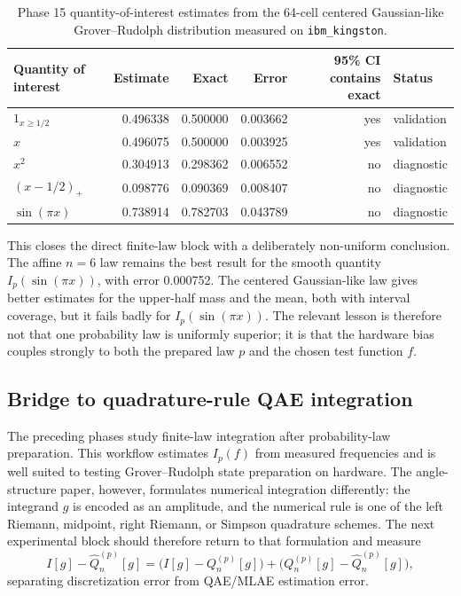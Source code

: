 \begin{table}[h]
\centering
\small
\begin{tabular}{lrrrrl}
\toprule
Quantity of interest & Estimate & Exact & Error & 95\% CI contains exact & Status \\
\midrule
\(1_{x\ge 1/2}\) & 0.496338 & 0.500000 & 0.003662 & yes & validation \\
\(x\) & 0.496075 & 0.500000 & 0.003925 & yes & validation \\
\(x^2\) & 0.304913 & 0.298362 & 0.006552 & no & diagnostic \\
\((x-1/2)_+\) & 0.098776 & 0.090369 & 0.008407 & no & diagnostic \\
\(\sin(\pi x)\) & 0.738914 & 0.782703 & 0.043789 & no & diagnostic \\
\bottomrule
\end{tabular}
\caption{Phase 15 quantity-of-interest estimates from the 64-cell centered
Gaussian-like Grover--Rudolph distribution measured on \texttt{ibm\_kingston}.}
\label{tab:phase15-gaussian-qoi}
\end{table}

This closes the direct finite-law block with a deliberately non-uniform
conclusion. The affine \(n=6\) law remains the best result for the smooth
quantity \(I_p(\sin(\pi x))\), with error 0.000752. The centered Gaussian-like
law gives better estimates for the upper-half mass and the mean, both with
interval coverage, but it fails badly for \(I_p(\sin(\pi x))\). The relevant
lesson is therefore not that one probability law is uniformly superior; it is
that the hardware bias couples strongly to both the prepared law \(p\) and the
chosen test function \(f\).

\subsection{Bridge to quadrature-rule QAE integration}

The preceding phases study finite-law integration after probability-law
preparation. This workflow estimates \(I_p(f)\) from measured frequencies and
is well suited to testing Grover--Rudolph state preparation on hardware. The
angle-structure paper, however, formulates numerical integration differently:
the integrand \(g\) is encoded as an amplitude, and the numerical rule is one
of the left Riemann, midpoint, right Riemann, or Simpson quadrature schemes.
The next experimental block should therefore return to that formulation and
measure
\[
  I[g]-\widehat Q_n^{(p)}[g]
  =
  \bigl(I[g]-Q_n^{(p)}[g]\bigr)
  +
  \bigl(Q_n^{(p)}[g]-\widehat Q_n^{(p)}[g]\bigr),
\]
separating discretization error from QAE/MLAE estimation error.


